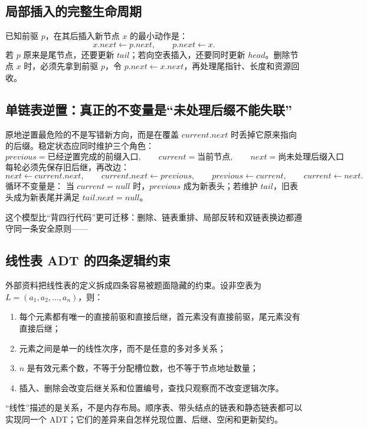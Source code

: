 \documentclass[UTF8,fontset=none,11pt,a4paper]{ctexart}
\begin{document}
\subsection{局部插入的完整生命周期}
已知前驱 $p$，在其后插入新节点 $x$ 的最小动作是：
\[
x.next\leftarrow p.next,\qquad p.next\leftarrow x.
\]
若 $p$ 原来是尾节点，还要更新 $tail$；若向空表插入，还要同时更新 $head$。删除节点 $x$ 时，必须先拿到前驱 $p$，令 $p.next\leftarrow x.next$，再处理尾指针、长度和资源回收。

\subsection{单链表逆置：真正的不变量是“未处理后缀不能失联”}
原地逆置最危险的不是写错新方向，而是在覆盖 $current.next$ 时丢掉它原来指向的后缀。稳定状态应同时维护三个角色：
\[
\boxed{
previous=\text{已经逆置完成的前缀入口},\qquad
current=\text{当前节点},\qquad
next=\text{尚未处理后缀入口}
}
\]
每轮必须先保存旧后继，再改边：
\[
next\leftarrow current.next,\qquad
current.next\leftarrow previous,\qquad
previous\leftarrow current,\qquad
current\leftarrow next.
\]
循环不变量是： 当 $current=null$ 时，$previous$ 成为新表头；若维护 $tail$，旧表头成为新表尾并满足 $tail.next=null$。

这个模型比“背四行代码”更可迁移：删除、链表重排、局部反转和双链表换边都遵守同一条安全原则——

\subsection{线性表 ADT 的四条逻辑约束}
外部资料把线性表的定义拆成四条容易被题面隐藏的约束。设非空表为
$L=(a_1,a_2,\ldots,a_n)$，则：
\begin{enumerate}
\item 每个元素都有唯一的直接前驱和直接后继，首元素没有直接前驱，尾元素没有直接后继；
\item 元素之间是单一的线性次序，而不是任意的多对多关系；
\item $n$ 是有效元素个数，不等于分配槽位数，也不等于节点地址数量；
\item 插入、删除会改变后继关系和位置编号，查找只观察而不改变逻辑次序。
\end{enumerate}
“线性”描述的是关系，不是内存布局。顺序表、带头结点的链表和静态链表都可以实现同一个 ADT；它们的差异来自怎样兑现位置、后继、空闲和更新契约。
\end{document}
